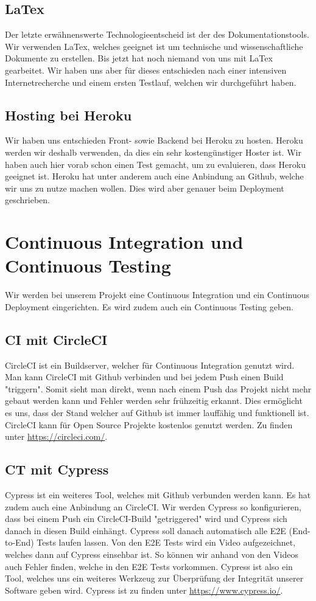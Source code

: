 	\subsection{LaTex}
	Der letzte erwähnenswerte Technologieentscheid ist der des Dokumentationstools. Wir verwenden LaTex, welches geeignet ist um technische und wissenschaftliche Dokumente zu erstellen. Bis jetzt hat noch niemand von uns mit LaTex gearbeitet. Wir haben uns aber für dieses entschieden nach einer intensiven Internetrecherche und einem ersten Testlauf, welchen wir durchgeführt haben.

	\subsection{Hosting bei Heroku}
	Wir haben uns entschieden Front- sowie Backend bei Heroku zu hosten. Heroku werden wir deshalb verwenden, da dies ein sehr kostengünstiger Hoster ist. Wir haben auch hier vorab schon einen Test gemacht, um zu evaluieren, dass Heroku geeignet ist. Heroku hat unter anderem auch eine Anbindung an Github, welche wir uns zu nutze machen wollen. Dies wird aber genauer beim Deployment geschrieben.

	\section{Continuous Integration und Continuous Testing}
	Wir werden bei unserem Projekt eine Continuous Integration und ein Continuous Deployment eingerichten. Es wird zudem auch ein Continuous Testing geben.

	\subsection{CI mit CircleCI}
	CircleCI ist ein Buildserver, welcher für Continuous Integration genutzt wird. Man kann CircleCI mit Github verbinden und bei jedem Push einen Build "triggern". Somit sieht man direkt, wenn nach einem Push das Projekt nicht mehr gebaut werden kann und Fehler werden sehr frühzeitig erkannt. Dies ermöglicht es uns, dass der Stand welcher auf Github ist immer lauffähig und funktionell ist. CircleCI kann für Open Source Projekte kostenlos genutzt werden. Zu finden unter \href{https://circleci.com/}{https://circleci.com/}.

	\subsection{CT mit Cypress}
	Cypress ist ein weiteres Tool, welches mit Github verbunden werden kann. Es hat zudem auch eine Anbindung an CircleCI. Wir werden Cypress so konfigurieren, dass bei einem Push ein CircleCI-Build "getriggered" wird und Cypress sich danach in diesen Build einhängt. Cypress soll danach automatisch alle E2E (End-to-End) Tests laufen lassen. Von den E2E Tests wird ein Video aufgezeichnet, welches dann auf Cypress einsehbar ist. So können wir anhand von den Videos auch Fehler finden, welche in den E2E Tests vorkommen. Cypress ist also ein Tool, welches uns ein weiteres Werkzeug zur Überprüfung der Integrität unserer Software geben wird. Cypress ist zu finden unter \href{https://www.cypress.io/}{https://www.cypress.io/}.

